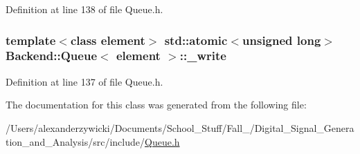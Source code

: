 Definition at line 138 of file Queue.\+h.

\hypertarget{class_backend_1_1_queue_ab3d5c4738092cf356b36c56f6ab61554}{
\subsubsection[{\+\_\+write}]{\setlength{\rightskip}{0pt plus 5cm}template$<$class element$>$ std\+::atomic$<$unsigned long$>$ {\bf Backend\+::\+Queue}$<$ element $>$\+::\+\_\+write\hspace{0.3cm}{\ttfamily [protected]}}}\label{class_backend_1_1_queue_ab3d5c4738092cf356b36c56f6ab61554}


Definition at line 137 of file Queue.\+h.



The documentation for this class was generated from the following file\+:\begin{DoxyCompactItemize}
\item 
/\+Users/alexanderzywicki/\+Documents/\+School\+\_\+\+Stuff/\+Fall\+\_/\+Digital\+\_\+\+Signal\+\_\+\+Generation\+\_\+and\+\_\+\+Analysis/src/include/\hyperlink{_queue_8h}{Queue.\+h}\end{DoxyCompactItemize}
